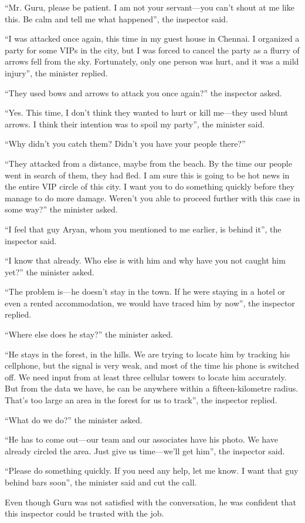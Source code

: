 “Mr. Guru, please be patient. I am not your servant—you can't shout at me like
this. Be calm and tell me what happened”, the inspector said.

“I was attacked once again, this time in my guest house in Chennai. I organized
a party for some VIPs in the city, but I was forced to cancel the party as a
flurry of arrows fell from the sky. Fortunately, only one person was hurt, and it
was a mild injury”, the minister replied.

“They used bows and arrows to attack you once again?” the inspector asked.

“Yes. This time, I don't think they wanted to hurt or kill me—they used blunt
arrows. I think their intention was to spoil my party”, the minister said.

“Why didn't you catch them? Didn't you have your people there?”

“They attacked from a distance, maybe from the beach. By the time our people
went in search of them, they had fled. I am sure this is going to be hot
news in the entire VIP circle of this city. I want you to do something quickly
before they manage to do more damage. Weren't you able to proceed further with
this case in some way?” the minister asked.

“I feel that guy Aryan, whom you mentioned to me earlier, is behind it”,
the inspector said.

“I know that already. Who else is with him and why have you not caught him yet?”
the minister asked.

“The problem is—he doesn't stay in the town. If he were staying in a hotel or
even a rented accommodation, we would have traced him by now”, the inspector
replied.

“Where else does he stay?” the minister asked.

“He stays in the forest, in the hills. We are trying to locate him by tracking
his cellphone, but the signal is very weak, and most of the time his phone is
switched off. We need input from at least three cellular towers to locate him
accurately. But from the data we have, he can be anywhere within a
fifteen-kilometre radius. That's too large an area in the forest for us to
track”, the inspector replied.

“What do we do?” the minister asked.

“He has to come out—our team and our associates have his photo. We have
already circled the area. Just give us time—we'll get him”, the inspector
said.

“Please do something quickly. If you need any help, let me know. I want that guy
behind bars soon”, the minister said and cut the call.

Even though Guru was not satisfied with the conversation, he was confident that
this inspector could be trusted with the job.